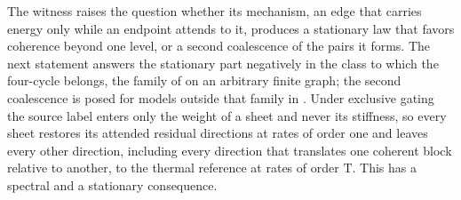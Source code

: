 The witness raises the question whether its mechanism, an edge that carries
energy only while an endpoint attends to it, produces a stationary law that
favors coherence beyond one level, or a second coalescence of the pairs it
forms. The next statement answers the stationary part negatively in the
class to which the four-cycle belongs, the family of
 on an arbitrary finite graph; the
second coalescence is posed for models outside that family in
. Under exclusive gating the source label
enters only the weight of a sheet and never its stiffness, so every sheet
restores its attended residual directions at rates of order one and leaves
every other direction, including every direction that translates one
coherent block relative to another, to the thermal reference at rates of
order \(\mathrm T\). This has a spectral and a stationary consequence.

